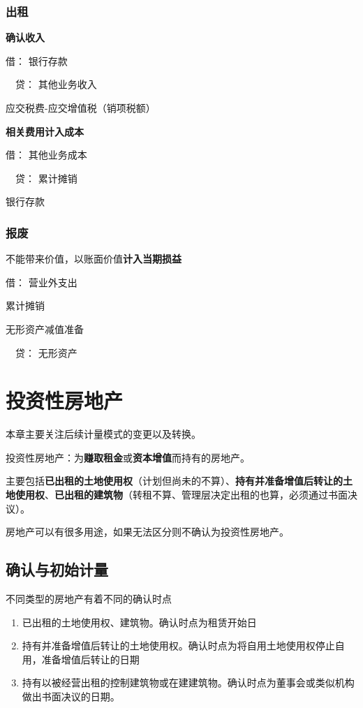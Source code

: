\documentclass[UTF8,12pt]{ctexart}
\newenvironment{Dr}{\noindent 借：}{\par}
\newenvironment{Cr}{\noindent \ \ 贷：}{\par}
\numberwithin{equation}{section} %
\numberwithin{figure}{section}
\numberwithin{table}{section}
\begin{document}
	\subsubsection{出租}
	
	\textbf{确认收入}
	
	\begin{Dr}
		银行存款
	\end{Dr}
	\begin{Cr}
		其他业务收入
		
		应交税费-应交增值税（销项税额）
	\end{Cr}

	
	\textbf{相关费用计入成本}
	
	\begin{Dr}
		其他业务成本
	\end{Dr}
	\begin{Cr}
		累计摊销
		
		银行存款
	\end{Cr}
	
	
	\subsubsection{报废}
	
	不能带来价值，以账面价值\textbf{计入当期损益}
	
	\begin{Dr}
		营业外支出
		
		累计摊销
		
		无形资产减值准备
	\end{Dr}
	\begin{Cr}
		无形资产
	\end{Cr}

	
	\newpage
	\section{投资性房地产}
	
	本章主要关注后续计量模式的变更以及转换。
	
	投资性房地产：为\textbf{赚取租金}或\textbf{资本增值}而持有的房地产。
	
	主要包括\textbf{已出租的土地使用权}（计划但尚未的不算）、\textbf{持有并准备增值后转让的土地使用权}、\textbf{已出租的建筑物}（转租不算、管理层决定出租的也算，必须通过书面决议）。
	
	房地产可以有很多用途，如果无法区分则不确认为投资性房地产。
	
	\subsection{确认与初始计量}
	不同类型的房地产有着不同的确认时点
	\begin{enumerate}
		\item 已出租的土地使用权、建筑物。确认时点为租赁开始日
		
		\item 持有并准备增值后转让的土地使用权。确认时点为将自用土地使用权停止自用，准备增值后转让的日期
		
		\item 持有以被经营出租的控制建筑物或在建建筑物。确认时点为董事会或类似机构做出书面决议的日期。
	\end{enumerate}
	
\end{document}
